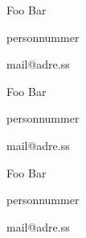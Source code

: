 \begin{itemize*}
	\item Foo Bar
	\begin{itemize*}
		\item personnummer
		\item mail@adre.ss
	\end{itemize*}
	\item Foo Bar
	\begin{itemize*}
		\item personnummer
		\item mail@adre.ss
	\end{itemize*}
	\item Foo Bar
	\begin{itemize*}
		\item personnummer
		\item mail@adre.ss
	\end{itemize*}
\end{itemize*}
